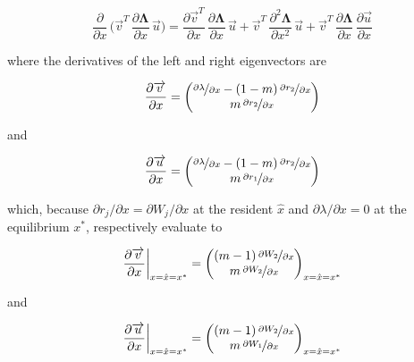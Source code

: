 \begin{equation}
    \frac{\partial}{\partial x} \, \bigg(\overrightarrow{v}^T \, \frac{\partial \pmb{\Lambda}}{\partial x} \, \overrightarrow{u}\bigg) = \frac{\partial \overrightarrow{v}^T}{\partial x}\,\frac{\partial \pmb{\Lambda}}{\partial x}\,\overrightarrow{u} + \overrightarrow{v}^T\,\frac{\partial^2 \pmb{\Lambda}}{\partial x^2}\,\overrightarrow{u} + \overrightarrow{v}^T\,\frac{\partial \pmb{\Lambda}}{\partial x}\,\frac{\partial \overrightarrow{u}}{\partial x}
    \label{eq:deriv_num_gradient_unevaluated}
\end{equation}

where the derivatives of the left and right eigenvectors are

\begin{equation}
    \frac{\partial \overrightarrow{v}}{\partial x} = 
    \begin{pmatrix}
        \nicefrac{\partial \lambda}{\partial x} - (1-m)\,\nicefrac{\partial r_2}{\partial x}\\
        m\,\nicefrac{\partial r_2}{\partial x}
    \end{pmatrix}
\end{equation}

and

\begin{equation}
    \frac{\partial \overrightarrow{u}}{\partial x} = 
    \begin{pmatrix}
        \nicefrac{\partial \lambda}{\partial x} - (1-m)\,\nicefrac{\partial r_2}{\partial x}\\
        m\,\nicefrac{\partial r_1}{\partial x}
    \end{pmatrix}
\end{equation}

which, because $\partial r_j / \partial x = \partial W_j / \partial x$ at the resident $\hat x$ and $\partial \lambda / \partial x = 0$ at the equilibrium $x^*$, respectively evaluate to

\begin{equation}
    \frac{\partial \overrightarrow{v}}{\partial x}\bigg|_{x=\hat x=x^*} = 
    \begin{pmatrix}
        (m-1)\,\nicefrac{\partial W_2}{\partial x}\\
        m\,\nicefrac{\partial W_2}{\partial x}
    \end{pmatrix}
    _{x=\hat x=x^*}
\end{equation}

and

\begin{equation}
    \frac{\partial \overrightarrow{u}}{\partial x}\bigg|_{x=\hat x=x^*} = 
    \begin{pmatrix}
        (m-1)\,\nicefrac{\partial W_2}{\partial x}\\
        m\,\nicefrac{\partial W_1}{\partial x}
    \end{pmatrix}
    _{x=\hat x=x^*}
    \label{eq:right_eigenvector_equilibrium}
\end{equation}

